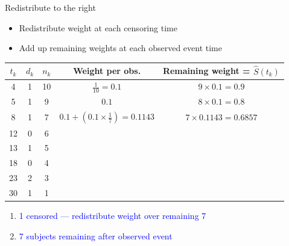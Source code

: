 \documentclass[10pt,t]{beamer}
\begin{document}
\begin{frame}{Redistribute to the right}
	
	\vspace{-5 mm}
	
	\begin{itemize}
		\item Redistribute weight at each censoring time
		
		\medskip
		
		\item Add up remaining weights at each observed event time
		
		\smallskip
		
	\end{itemize}
	\begin{footnotesize}
		\begin{center}
		\begin{tabular}{|c|c|c|c|c|}
			\hline
			$t_k$ & $d_k$ & $n_k$ & Weight per obs. & Remaining weight = $\widehat{S}(t_k)$ \\
			\hline
			4 & 1 & 10 & $\frac{1}{10} = 0.1$ & $9\times 0.1= 0.9$\\
			5 & 1 & 9 & $0.1$ &  $8\times 0.1= 0.8$  \\
			8 & 1 & 7 & $0.1 + (0.1\times \frac{1}{7}) = 0.1143$ & $7 \times 0.1143 = 0.6857$\\
			12 & 0 & 6 & & \\
			13 & 1 & 5 & & \\
			18 & 0 & 4 & & \\
			23 & 2 & 3 & & \\
			30 & 1 & 1 & & \\
			\hline
		\end{tabular}
	\end{center}
	\end{footnotesize}

\medskip
	\begin{enumerate}
		\item \textcolor{blue}{1 censored --- redistribute weight over remaining 7}
		
		\medskip
		
		\item \textcolor{blue}{7 subjects remaining after observed event}
	\end{enumerate}
\end{frame}
\end{document}
